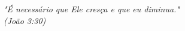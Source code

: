 \begin{epigrafe}
    \vspace*{\fill}
	\begin{flushright}
		\textit{"É necessário que Ele cresça e que eu diminua."\\
			(João 3:30)}
	\end{flushright}
\end{epigrafe}
